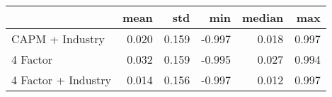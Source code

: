 \begin{tabular}{lrrrrr}
\toprule
{} &   mean &    std &    min &  median &    max \\
\midrule
 CAPM + Industry    &  0.020 &  0.159 & -0.997 &   0.018 &  0.997 \\
4 Factor            &  0.032 &  0.159 & -0.995 &   0.027 &  0.994 \\
4 Factor + Industry &  0.014 &  0.156 & -0.997 &   0.012 &  0.997 \\
\bottomrule
\end{tabular}
